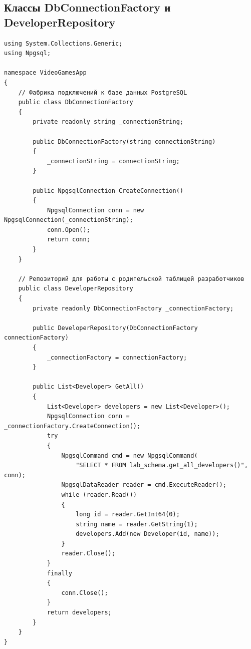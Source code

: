 \documentclass[oneside,a4paper,14pt]{extarticle}
\begin{document}
	\subsection*{Классы DbConnectionFactory и DeveloperRepository}
	\begin{lstlisting}[language={[Sharp]C}]
using System.Collections.Generic;
using Npgsql;

namespace VideoGamesApp
{
    // Фабрика подключений к базе данных PostgreSQL
    public class DbConnectionFactory
    {
        private readonly string _connectionString;

        public DbConnectionFactory(string connectionString)
        {
            _connectionString = connectionString;
        }

        public NpgsqlConnection CreateConnection()
        {
            NpgsqlConnection conn = new NpgsqlConnection(_connectionString);
            conn.Open();
            return conn;
        }
    }

    // Репозиторий для работы с родительской таблицей разработчиков
    public class DeveloperRepository
    {
        private readonly DbConnectionFactory _connectionFactory;

        public DeveloperRepository(DbConnectionFactory connectionFactory)
        {
            _connectionFactory = connectionFactory;
        }

        public List<Developer> GetAll()
        {
            List<Developer> developers = new List<Developer>();
            NpgsqlConnection conn = _connectionFactory.CreateConnection();
            try
            {
                NpgsqlCommand cmd = new NpgsqlCommand(
                    "SELECT * FROM lab_schema.get_all_developers()", conn);
                NpgsqlDataReader reader = cmd.ExecuteReader();
                while (reader.Read())
                {
                    long id = reader.GetInt64(0);
                    string name = reader.GetString(1);
                    developers.Add(new Developer(id, name));
                }
                reader.Close();
            }
            finally
            {
                conn.Close();
            }
            return developers;
        }
    }
}
	\end{lstlisting}
	
\end{document}
